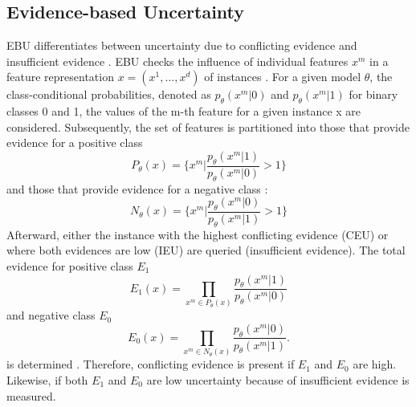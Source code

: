 \subsection{Evidence-based Uncertainty} 
\label{subsec:evidence_based_uncertainty}
%
\Ac{EBU} differentiates between uncertainty due to conflicting evidence and insufficient evidence \cite{nguyen2021howtomeasure}.
\ac{EBU} checks the influence of individual features $x^m$ in a feature representation 
$x = (x^1,..., x^d)$ of instances \cite{nguyen2021howtomeasure}.
For a given model $\theta$, the class-conditional probabilities, denoted as $p_{\theta}(x^m |0)$ and $p_{\theta}(x^m | 1)$ for binary classes 0 and 1, the values of the m-th feature for a given instance x are considered.
Subsequently, the set of features is partitioned into those that provide evidence for a positive class
\begin{equation}
    P_{\theta}(x) = \bigg\{ x^m \bigg| \frac{p_{\theta}(x^m|1)}{p_{\theta}(x^m|0)} > 1 \bigg\} 
\end{equation}
and those that provide evidence for a negative class \cite{nguyen2021howtomeasure}:
 \begin{equation}
    N_{\theta}(x) = \bigg\{ x^m \bigg| \frac{p_{\theta}(x^m|0)}{p_{\theta}(x^m|1)} > 1 \bigg\} 
\end{equation}
Afterward, either the instance with the highest conflicting evidence (\ac{CEU}) or where both evidences are low (\ac{IEU}) are queried (insufficient evidence).
The total evidence for positive class $E_1$ 
\begin{equation}
    E_1(x) = \prod\limits_{x^m \in P_{\theta}(x)} \frac{p_{\theta}(x^m|1)}{p_{\theta}(x^m|0)}
\end{equation}
and negative class $E_0$
\begin{equation}
    E_0(x) = \prod\limits_{x^m \in N_{\theta}(x)} \frac{p_{\theta}(x^m|0)}{p_{\theta}(x^m|1)}.
\end{equation} 
is determined \cite{nguyen2021howtomeasure}.
Therefore, conflicting evidence is present if $E_1$ and $E_0$ are high.
Likewise, if both $E_1$ and $E_0$ are low uncertainty because of insufficient evidence is measured.
